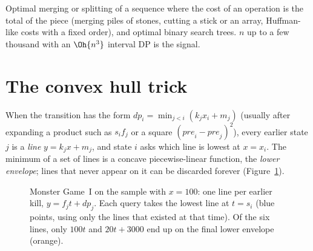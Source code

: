 
\begin{recognize}
Optimal merging or splitting of a sequence where the cost of an operation is the total of the piece (merging piles of stones, cutting
a stick or an array, Huffman-like costs with a fixed order), and optimal binary search trees. $n$ up to a few thousand with an
$\Oh{n^3}$ interval DP is the signal.
\end{recognize}

\section[Convex hull trick]{The convex hull trick \hfill \plat}\label{sec:cht}

When the transition has the form $dp_i = \min_{j < i} (k_j x_i + m_j)$ (usually after expanding a product such as $s_i f_j$ or a square
$(\mathit{pre}_i - \mathit{pre}_j)^2$), every earlier state $j$ is a \emph{line} $y = k_j x + m_j$, and state $i$ asks which line is
lowest at $x = x_i$. The minimum of a set of lines is a concave piecewise-linear function, the \emph{lower envelope}; lines that never
appear on it can be discarded forever (Figure~\ref{fig:cht}).

\begin{figure}[htbp]
\centering
{}
\caption{Monster Game~I on the sample with $x = 100$: one line per earlier kill, $y = f_j t + dp_j$. Each query takes the lowest line
at $t = s_i$ (blue points, using only the lines that existed at that time). Of the six lines, only $100t$ and $20t + 3000$ end up on the
final lower envelope (orange).}
\label{fig:cht}
\end{figure}

